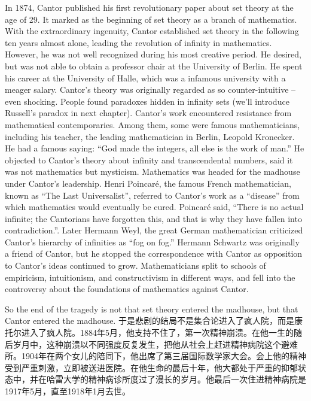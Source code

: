 \documentclass{article}
\begin{document}
In 1874, Cantor published his first revolutionary paper about set theory at the age of 29. It marked as the beginning of set theory as a branch of mathematics. With the extraordinary ingenuity, Cantor established set theory in the following ten years almost alone, leading the revolution of infinity in mathematics. However, he was not well recognized during his most creative period. He desired, but was not able to obtain a professor chair at the University of Berlin. He spent his career at the University of Halle, which was a infamous university with a meager salary. Cantor's theory was originally regarded as so counter-intuitive – even shocking. People found paradoxes hidden in infinity sets (we'll introduce Russell's paradox in next chapter). Cantor's work encountered resistance from mathematical contemporaries. Among them, some were famous mathematicians, including his teacher, the leading mathematician in Berlin, Leopold Kronecker. He had a famous saying: ``God made the integers, all else is the work of man.'' He objected to Cantor's theory about infinity and transcendental numbers, said it was not mathematics but mysticism. Mathematics was headed for the madhouse under Cantor's leadership. Henri Poincaré, the famous French mathematician, known as ``The Last Universalist'', referred to Cantor's work as a ``disease'' from which mathematics would eventually be cured. Poincaré said, ``There is no actual infinite; the Cantorians have forgotten this, and that is why they have fallen into contradiction.''. Later Hermann Weyl, the great German mathematician criticized Cantor's hierarchy of infinities as ``fog on fog.'' Hermann Schwartz was originally a friend of Cantor, but he stopped the correspondence with Cantor as opposition to Cantor's ideas continued to grow. Mathematicians split to schools of empiricism, intuitionism, and constructivism in different ways, and fell into the controversy about the foundations of mathematics against Cantor.

So the end of the tragedy is not that set theory entered the madhouse, but that Cantor entered the madhouse.
于是悲剧的结局不是集合论进入了疯人院，而是康托尔进入了疯人院。1884年5月，他支持不住了，第一次精神崩溃。在他一生的随后岁月中，这种崩溃以不同强度反复发生，把他从社会上赶进精神病院这个避难所。1904年在两个女儿的陪同下，他出席了第三届国际数学家大会。会上他的精神受到严重刺激，立即被送进医院。在他生命的最后十年，他大都处于严重的抑郁状态中，并在哈雷大学的精神病诊所度过了漫长的岁月。他最后一次住进精神病院是1917年5月，直至1918年1月去世。
\end{document}
